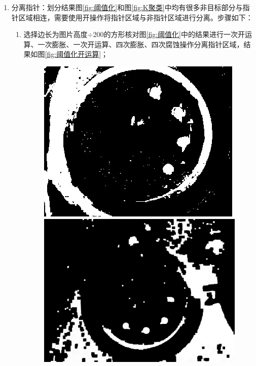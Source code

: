 \documentclass[a4paper]{ctexart}
\begin{document}
\begin{enumerate}[label=\arabic*、]
	\item 分离指针：划分结果图\ref{fig:阈值化}和图\ref{fig:K聚类}中均有很多非目标部分与指针区域相连，需要使用开操作将指针区域与非指针区域进行分离。步骤如下：
	\begin{enumerate}[label=\alph*)]
		\item 选择边长为图片高度$\div$200的方形核对图\ref{fig:阈值化}中的结果进行一次开运算、一次膨胀、一次开运算、四次膨胀、四次腐蚀操作分离指针区域，结果如图\ref{fig:阈值化开运算}；
		\begin{figure}[htbp]
			\centering
			\begin{minipage}[t]{0.25\textwidth}
				\centering
				\includegraphics[width=\textwidth]{figure/open_1/img1.jpg}
			\end{minipage}
			\begin{minipage}[t]{0.25\textwidth}
				\centering
				\includegraphics[width=\textwidth]{figure/open_1/img2.jpg}

\end{minipage}
\end{figure}
\end{enumerate}
\end{enumerate}
\end{document}
